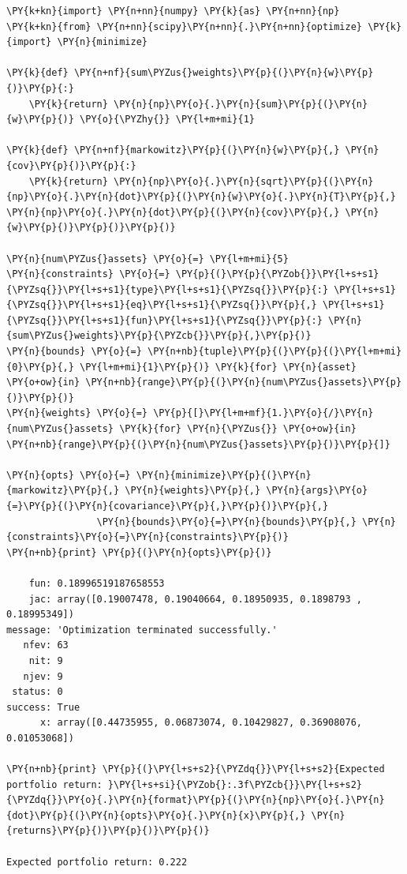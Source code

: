\begin{tcolorbox}[breakable, size=fbox, boxrule=1pt, pad at break*=1mm,colback=cellbackground, colframe=cellborder]
\begin{Verbatim}[commandchars=\\\{\}]
\PY{k+kn}{import} \PY{n+nn}{numpy} \PY{k}{as} \PY{n+nn}{np}
\PY{k+kn}{from} \PY{n+nn}{scipy}\PY{n+nn}{.}\PY{n+nn}{optimize} \PY{k}{import} \PY{n}{minimize}
		
\PY{k}{def} \PY{n+nf}{sum\PYZus{}weights}\PY{p}{(}\PY{n}{w}\PY{p}{)}\PY{p}{:} 
    \PY{k}{return} \PY{n}{np}\PY{o}{.}\PY{n}{sum}\PY{p}{(}\PY{n}{w}\PY{p}{)} \PY{o}{\PYZhy{}} \PY{l+m+mi}{1}
		
\PY{k}{def} \PY{n+nf}{markowitz}\PY{p}{(}\PY{n}{w}\PY{p}{,} \PY{n}{cov}\PY{p}{)}\PY{p}{:}
    \PY{k}{return} \PY{n}{np}\PY{o}{.}\PY{n}{sqrt}\PY{p}{(}\PY{n}{np}\PY{o}{.}\PY{n}{dot}\PY{p}{(}\PY{n}{w}\PY{o}{.}\PY{n}{T}\PY{p}{,} \PY{n}{np}\PY{o}{.}\PY{n}{dot}\PY{p}{(}\PY{n}{cov}\PY{p}{,} \PY{n}{w}\PY{p}{)}\PY{p}{)}\PY{p}{)}
		
\PY{n}{num\PYZus{}assets} \PY{o}{=} \PY{l+m+mi}{5}
\PY{n}{constraints} \PY{o}{=} \PY{p}{(}\PY{p}{\PYZob{}}\PY{l+s+s1}{\PYZsq{}}\PY{l+s+s1}{type}\PY{l+s+s1}{\PYZsq{}}\PY{p}{:} \PY{l+s+s1}{\PYZsq{}}\PY{l+s+s1}{eq}\PY{l+s+s1}{\PYZsq{}}\PY{p}{,} \PY{l+s+s1}{\PYZsq{}}\PY{l+s+s1}{fun}\PY{l+s+s1}{\PYZsq{}}\PY{p}{:} \PY{n}{sum\PYZus{}weights}\PY{p}{\PYZcb{}}\PY{p}{,}\PY{p}{)} 
\PY{n}{bounds} \PY{o}{=} \PY{n+nb}{tuple}\PY{p}{(}\PY{p}{(}\PY{l+m+mi}{0}\PY{p}{,} \PY{l+m+mi}{1}\PY{p}{)} \PY{k}{for} \PY{n}{asset} \PY{o+ow}{in} \PY{n+nb}{range}\PY{p}{(}\PY{n}{num\PYZus{}assets}\PY{p}{)}\PY{p}{)}
\PY{n}{weights} \PY{o}{=} \PY{p}{[}\PY{l+m+mf}{1.}\PY{o}{/}\PY{n}{num\PYZus{}assets} \PY{k}{for} \PY{n}{\PYZus{}} \PY{o+ow}{in} \PY{n+nb}{range}\PY{p}{(}\PY{n}{num\PYZus{}assets}\PY{p}{)}\PY{p}{]}
		
\PY{n}{opts} \PY{o}{=} \PY{n}{minimize}\PY{p}{(}\PY{n}{markowitz}\PY{p}{,} \PY{n}{weights}\PY{p}{,} \PY{n}{args}\PY{o}{=}\PY{p}{(}\PY{n}{covariance}\PY{p}{,}\PY{p}{)}\PY{p}{,}
                \PY{n}{bounds}\PY{o}{=}\PY{n}{bounds}\PY{p}{,} \PY{n}{constraints}\PY{o}{=}\PY{n}{constraints}\PY{p}{)}
\PY{n+nb}{print} \PY{p}{(}\PY{n}{opts}\PY{p}{)}

	fun: 0.18996519187658553
	jac: array([0.19007478, 0.19040664, 0.18950935, 0.1898793 , 0.18995349])
message: 'Optimization terminated successfully.'
   nfev: 63
    nit: 9
   njev: 9
 status: 0
success: True
      x: array([0.44735955, 0.06873074, 0.10429827, 0.36908076, 0.01053068])

\PY{n+nb}{print} \PY{p}{(}\PY{l+s+s2}{\PYZdq{}}\PY{l+s+s2}{Expected portfolio return: }\PY{l+s+si}{\PYZob{}:.3f\PYZcb{}}\PY{l+s+s2}{\PYZdq{}}\PY{o}{.}\PY{n}{format}\PY{p}{(}\PY{n}{np}\PY{o}{.}\PY{n}{dot}\PY{p}{(}\PY{n}{opts}\PY{o}{.}\PY{n}{x}\PY{p}{,} \PY{n}{returns}\PY{p}{)}\PY{p}{)}\PY{p}{)}

Expected portfolio return: 0.222
\end{Verbatim}
\end{tcolorbox}

